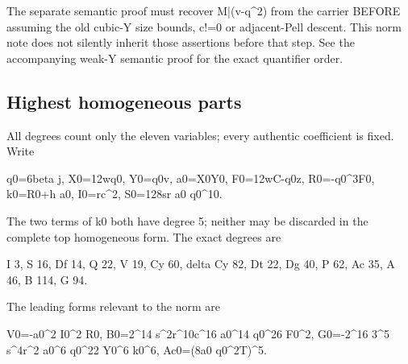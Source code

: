 The separate semantic proof must recover M|(v-q\textasciicircum{}\allowbreak{}2) from the carrier BEFORE assuming the old cubic-Y size bounds, c!=\allowbreak{}0 or adjacent-Pell descent. This norm note does not silently inherit those assertions before that step. See the accompanying weak-Y semantic proof for the exact quantifier order.



\subsection*{Highest homogeneous parts}



All degrees count only the eleven variables; every authentic coefficient is fixed. Write



q0=\allowbreak{}6beta j, X0=\allowbreak{}12wq0, Y0=\allowbreak{}q0v, a0=\allowbreak{}X0Y0, F0=\allowbreak{}12wC-q0z, R0=\allowbreak{}-q0\textasciicircum{}\allowbreak{}3F0, k0=\allowbreak{}R0+\allowbreak{}h a0, I0=\allowbreak{}rc\textasciicircum{}\allowbreak{}2, S0=\allowbreak{}128sr a0 q0\textasciicircum{}\allowbreak{}10.



The two terms of k0 both have degree 5; neither may be discarded in the complete top homogeneous form. The exact degrees are



I 3, S 16, Df 14, Q 22, V 19, Cy 60, delta Cy 82, Dt 22, Dg 40, P 62, Ac 35, A 46, B 114, G 94.



The leading forms relevant to the norm are



V0=\allowbreak{}-a0\textasciicircum{}\allowbreak{}2 I0\textasciicircum{}\allowbreak{}2 R0, B0=\allowbreak{}2\textasciicircum{}\allowbreak{}14 s\textasciicircum{}\allowbreak{}2r\textasciicircum{}\allowbreak{}10c\textasciicircum{}\allowbreak{}16 a0\textasciicircum{}\allowbreak{}14 q0\textasciicircum{}\allowbreak{}26 F0\textasciicircum{}\allowbreak{}2, G0=\allowbreak{}-2\textasciicircum{}\allowbreak{}16 3\textasciicircum{}\allowbreak{}5 s\textasciicircum{}\allowbreak{}4r\textasciicircum{}\allowbreak{}2 a0\textasciicircum{}\allowbreak{}6 q0\textasciicircum{}\allowbreak{}22 Y0\textasciicircum{}\allowbreak{}6 k0\textasciicircum{}\allowbreak{}6, Ac0=\allowbreak{}(8a0 q0\textasciicircum{}\allowbreak{}2T)\textasciicircum{}\allowbreak{}5.



